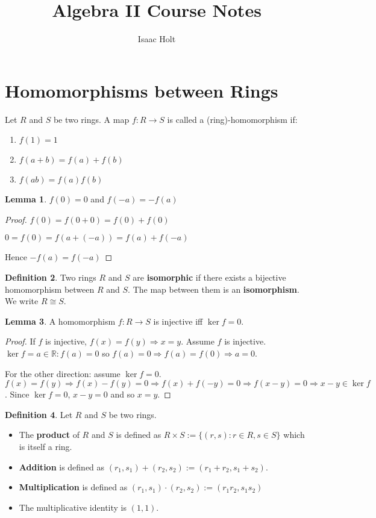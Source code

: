 \documentclass[12pt,a4paper]{article}
\title{Algebra II Course Notes}
\author{Isaac Holt}
\theoremstyle{definition}
\newtheorem{definition}{Definition}[subsection]
\newtheorem{lemma}[definition]{Lemma}
\begin{document}
\maketitle

\section{Homomorphisms between Rings}

Let $R$ and $S$ be two rings. A map $f: R \rightarrow S$ is called a (ring)-homomorphism if:
\begin{enumerate}
	\item $f(1) = 1$
	\item $f(a + b) = f(a) + f(b)$
	\item $f(ab) = f(a)f(b)$
\end{enumerate}

\begin{lemma}
	$f(0) = 0$ and $f(-a) = -f(a)$
\end{lemma}

\begin{proof}
	$f(0) = f(0 + 0) = f(0) + f(0)$

	$0 = f(0) = f(a + (-a)) = f(a) + f(-a)$

	Hence $-f(a) = f(-a)$
\end{proof}

\begin{definition}
	Two rings $R$ and $S$ are \textbf{isomorphic} if there exists a bijective homomorphism between $R$ and $S$. The map between them is an \textbf{isomorphism}. We write $R \cong S$.
\end{definition}

\begin{lemma}
	A homomorphism $f: R \rightarrow S$ is injective iff $\ker f = {0}$.
\end{lemma}

\begin{proof}
	If $f$ is injective, $f(x) = f(y) \Rightarrow x = y$. Assume $f$ is injective. $\ker f = {a \in \mathbb{R}: f(a) = 0}$ so $f(a) = 0 \Rightarrow f(a) = f(0) \Rightarrow a = 0$.

	For the other direction: assume $\ker f = {0}$. $f(x) = f(y) \Rightarrow f(x) - f(y) = 0 \Rightarrow f(x) + f(-y) = 0 \Rightarrow f(x - y) = 0 \Rightarrow x - y \in \ker f$. Since $\ker f = {0}$, $x - y = 0$ and so $x = y$.
\end{proof}

\begin{definition}
	Let $R$ and $S$ be two rings.
	\begin{itemize}
		\item The \textbf{product} of $R$ and $S$ is defined as $R \times S := \{(r, s): r \in R, s \in S\}$ which is itself a ring.
		\item \textbf{Addition} is defined as $(r_1, s_1) + (r_2, s_2) := (r_1 + r_2, s_1 + s_2)$.
		\item \textbf{Multiplication} is defined as $(r_1, s_1) \cdot (r_2, s_2) := (r_1 r_2, s_1 s_2)$
		\item The multiplicative identity is $(1, 1)$.
	\end{itemize}
\end{definition}
\end{document}
